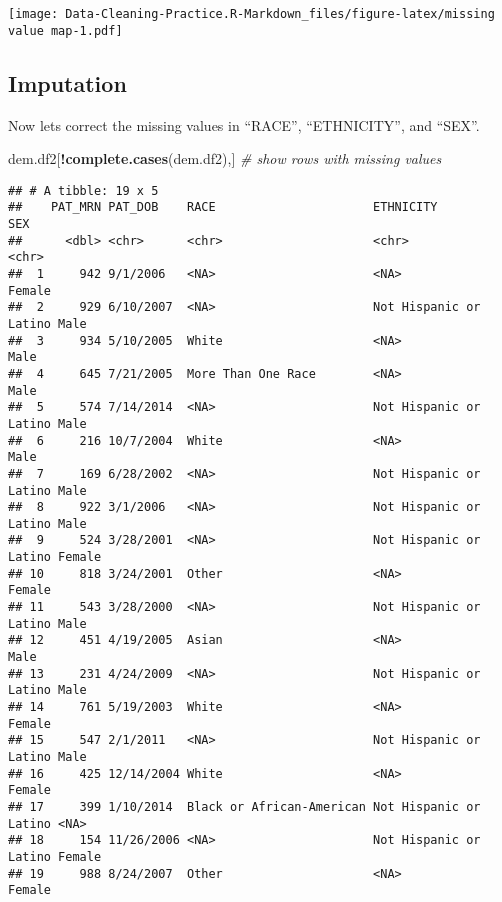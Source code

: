 \documentclass[
]{article}
\newenvironment{Shaded}{\begin{snugshade}}{\end{snugshade}}
\newcommand{\CommentTok}[1]{\textcolor[rgb]{0.56,0.35,0.01}{\textit{#1}}}
\newcommand{\FunctionTok}[1]{\textcolor[rgb]{0.13,0.29,0.53}{\textbf{#1}}}
\newcommand{\NormalTok}[1]{#1}
\newcommand{\SpecialCharTok}[1]{\textcolor[rgb]{0.81,0.36,0.00}{\textbf{#1}}}
\begin{document}
\texttt{[image: Data-Cleaning-Practice.R-Markdown\_files/figure-latex/missing value map-1.pdf]}

\hypertarget{imputation}{%
\subsection{Imputation}\label{imputation}}

Now lets correct the missing values in ``RACE'', ``ETHNICITY'', and
``SEX''.

\begin{Shaded}
\begin{Highlighting}[]
\NormalTok{dem.df2[}\SpecialCharTok{!}\FunctionTok{complete.cases}\NormalTok{(dem.df2),] }\CommentTok{\# show rows with missing values}
\end{Highlighting}
\end{Shaded}

\begin{verbatim}
## # A tibble: 19 x 5
##    PAT_MRN PAT_DOB    RACE                      ETHNICITY              SEX   
##      <dbl> <chr>      <chr>                     <chr>                  <chr> 
##  1     942 9/1/2006   <NA>                      <NA>                   Female
##  2     929 6/10/2007  <NA>                      Not Hispanic or Latino Male  
##  3     934 5/10/2005  White                     <NA>                   Male  
##  4     645 7/21/2005  More Than One Race        <NA>                   Male  
##  5     574 7/14/2014  <NA>                      Not Hispanic or Latino Male  
##  6     216 10/7/2004  White                     <NA>                   Male  
##  7     169 6/28/2002  <NA>                      Not Hispanic or Latino Male  
##  8     922 3/1/2006   <NA>                      Not Hispanic or Latino Male  
##  9     524 3/28/2001  <NA>                      Not Hispanic or Latino Female
## 10     818 3/24/2001  Other                     <NA>                   Female
## 11     543 3/28/2000  <NA>                      Not Hispanic or Latino Male  
## 12     451 4/19/2005  Asian                     <NA>                   Male  
## 13     231 4/24/2009  <NA>                      Not Hispanic or Latino Male  
## 14     761 5/19/2003  White                     <NA>                   Female
## 15     547 2/1/2011   <NA>                      Not Hispanic or Latino Male  
## 16     425 12/14/2004 White                     <NA>                   Female
## 17     399 1/10/2014  Black or African-American Not Hispanic or Latino <NA>  
## 18     154 11/26/2006 <NA>                      Not Hispanic or Latino Female
## 19     988 8/24/2007  Other                     <NA>                   Female
\end{verbatim}
\end{document}
